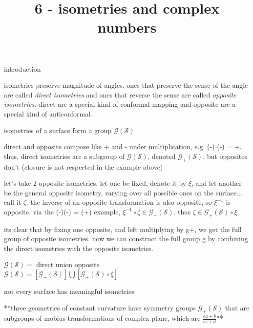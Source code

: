 \documentclass{article}
\title{6 - isometries and complex numbers}
\newenvironment{andrew_section}[1]
    {
    \section{#1}
    \begin{itemize}
    }
    {
    \end{itemize}
    }
\begin{document}
\maketitle

\begin{andrew_section}{introduction}
    \item 
        isometries preserve magnitude of angles.  ones
        that preserve the sense of the angle are called
        \emph{direct isometries} and ones that reverse the
        sense are called \emph{opposite isometries}. direct are a
        special kind of conformal mapping and opposite are a special
        kind of anticonformal.
    \item 
        isometries of a surface form a group $\mathcal{G}(\mathcal{S})$
    \item 
        direct and opposite compose like + and - under multiplication,
        e.g. (-) (-) = +. thus, direct isometries are a subgroup of 
        $\mathcal{G}(\mathcal{S})$, denoted 
        $\mathcal{G}_+(\mathcal{S})$, but opposites don't (closure
        is not respected in the example above)
    \item 
        let's take 2 opposite isometries.  let one be fixed, denote 
        it by $\xi$, and let another be the general opposite
        isometry, varying over all possible ones on the surface...
        call  it $\zeta$.  the inverse of an opposite transformation
        is also opposite, so $\xi^{-1}$ is opposite.  via the 
        (-)(-) = (+) example, 
        $\xi^{-1} \circ \zeta \in \mathcal{G}_+(\mathcal{S})$.  thus 
        $\zeta \in \mathcal{G}_+(\mathcal{S}) \circ \xi$
    \item 
        its clear that by fixing one opposite, and left multiplying by g+,
        we get the full group of opposite isometries.  now we can construct
        the full group g by combining the direct isometries with the opposite
        isometries.
    \item 
        $\mathcal{G}(\mathcal{S}) = $ direct union opposite \\
        $\mathcal{G}(\mathcal{S}) = [\mathcal{G}_+(\mathcal{S})] \bigcup [\mathcal{G}_+(\mathcal{S}) \circ \xi]$ 
    \item 
        not every surface has meaningful isometries
    \item 
        **three geometries of constant curvature have symmetry
        groups $\mathcal{G}_+(\mathcal{S})$ that are subgroups
        of mobius transformations of complex plane, which are
        $\frac{az+b}{cz+d}$**

\end{andrew_section}
\end{document}
